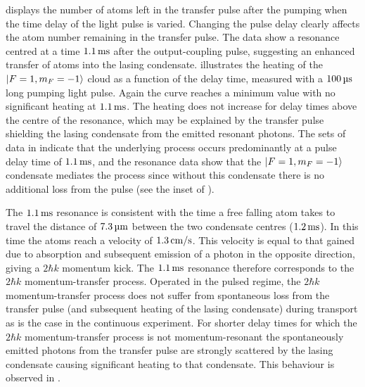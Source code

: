  displays the number of atoms left in the transfer pulse after the pumping when the time delay of the light pulse is varied.  Changing the pulse delay clearly affects the atom number remaining in the transfer pulse.  The data show a resonance centred at a time $\unit[1.1]{ms}$ after the output-coupling pulse, suggesting an enhanced transfer of atoms into the lasing condensate.   illustrates the heating of the ${\left|F=1, m_F=-1\right>}$ cloud as a function of the delay time, measured with a $\unit[100]{\micro s}$ long pumping light pulse.  Again the curve reaches a minimum value with no significant heating at $\unit[1.1]{ms}$.  The heating does not increase for delay times above the centre of the resonance, which may be explained by the transfer pulse shielding the lasing condensate from the emitted resonant photons.  The sets of data in  indicate that the underlying process occurs predominantly at a pulse delay time of $\unit[1.1]{ms}$, and the resonance data show that the ${\left|F=1, m_F=-1\right>}$ condensate mediates the process since without this condensate there is no additional loss from the pulse (see the inset of ).

The $\unit[1.1]{ms}$ resonance is consistent with the time a free falling atom takes to travel the distance of $\unit[7.3]{\micro m}$ between the two condensate centres ($\unit[1.2]{ms}$).  In this time the atoms reach a velocity of $\unit[1.3]{cm/s}$.  This velocity is equal to that gained due to absorption and subsequent emission of a photon in the opposite direction, giving a $2 \hbar k$ momentum kick.  The $\unit[1.1]{ms}$ resonance therefore corresponds to the $2 \hbar k$ momentum-transfer process.  Operated in the pulsed regime, the $2 \hbar k$ momentum-transfer process does not suffer from spontaneous loss from the transfer pulse (and subsequent heating of the lasing condensate) during transport as is the case in the continuous experiment.  For shorter delay times for which the $2 \hbar k$ momentum-transfer process is not momentum-resonant the spontaneously emitted photons from the transfer pulse are strongly scattered by the lasing condensate causing significant heating to that condensate.  This behaviour is observed in .

